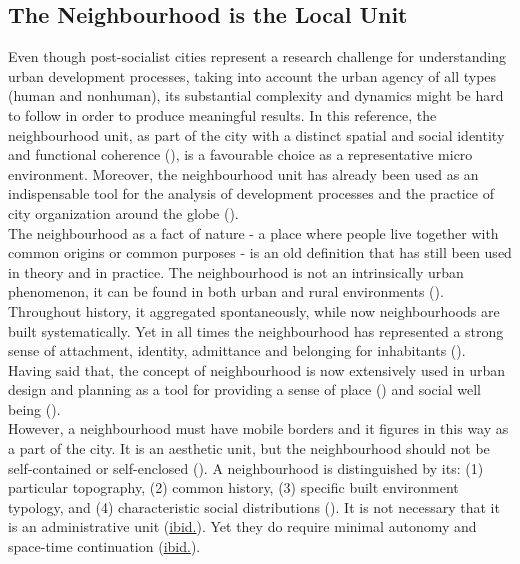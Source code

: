 \documentclass[11pt]{report}
\begin{document}
{{{{\subsection{The Neighbourhood is the Local Unit}

Even though post-socialist cities represent a research challenge for understanding urban development processes, taking into account the urban agency of all types (human and nonhuman), its substantial complexity and dynamics might be hard to follow in order to produce meaningful results. In this reference, the neighbourhood unit, as part of the city with a distinct spatial and social identity and functional coherence (\href{Merlin}{\citealt{choay_dictionnaire_2010}}), is a favourable choice as a representative micro environment.
Moreover, the neighbourhood unit has already been used as an indispensable tool for the analysis of development processes and the practice of city organization around the globe (\href{Meenakshi}{\citealt{meenakshi_neighborhood_2011}}).
\\

The neighbourhood as a fact of nature - a place where people live together with common origins or common purposes - is an old definition  \href{Mumford}{\cite{mumford_neighborhood_1954}}
that has still been used in theory and in practice. The neighbourhood is not an intrinsically urban phenomenon, it can be found in both urban and rural environments
(\href{Merlin}{\citealt{choay_dictionnaire_2010}}).
\\

Throughout history, it aggregated spontaneously, while now neighbourhoods are built systematically.
Yet in all times the neighbourhood has represented a strong sense of attachment, identity, admittance and belonging for inhabitants (\href{Meenakshi}{\citealt{meenakshi_neighborhood_2011}}).
Having said that, the concept of neighbourhood is now extensively used in urban design and planning as a tool for providing a sense of place (\href{Patricios}{\citealt{patricios_urban_2002}}) and social well being (\href{Meenakshi}{\citealt{meenakshi_neighborhood_2011}}).
\\

However, a neighbourhood must have mobile borders and it figures in this way as a part of the city. It is an aesthetic unit, but the neighbourhood should not be self-contained or self-enclosed (\href{Mumford}{\citealt{mumford_neighborhood_1954}}).
A neighbourhood is distinguished by its: (1) particular topography, (2) common history, (3) specific built environment typology, and (4) characteristic social distributions
(\href{Merlin}{\citealt{choay_dictionnaire_2010}}).
It is not necessary that it is an administrative unit (\href{Merlin}{ibid.}).
Yet they do require minimal autonomy and space-time continuation (\href{Merlin}{ibid.}).
\\

}}}}
\end{document}

